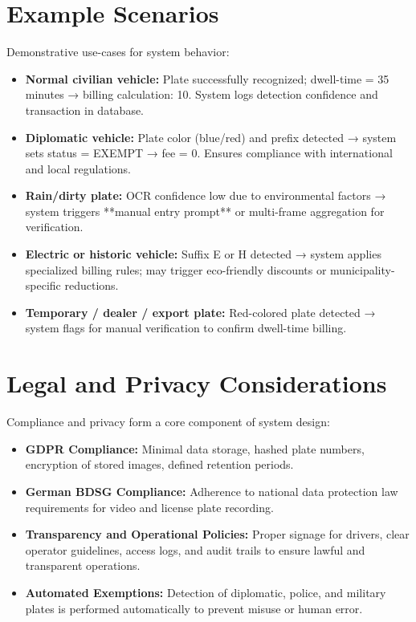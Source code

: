 	\section{Example Scenarios}
	Demonstrative use-cases for system behavior:
	
	\begin{itemize}
		\item \textbf{Normal civilian vehicle:} Plate successfully recognized; dwell-time = 35 minutes → billing calculation: \texteuro{}10. System logs detection confidence and transaction in database.
		\item \textbf{Diplomatic vehicle:} Plate color (blue/red) and prefix detected → system sets status = EXEMPT → fee = \texteuro{}0. Ensures compliance with international and local regulations.
		\item \textbf{Rain/dirty plate:} OCR confidence low due to environmental factors → system triggers **manual entry prompt** or multi-frame aggregation for verification.
		\item \textbf{Electric or historic vehicle:} Suffix E or H detected → system applies specialized billing rules; may trigger eco-friendly discounts or municipality-specific reductions.
		\item \textbf{Temporary / dealer / export plate:} Red-colored plate detected → system flags for manual verification to confirm dwell-time billing.
	\end{itemize}
	
	\section{Legal and Privacy Considerations}
	Compliance and privacy form a core component of system design:
	
	\begin{itemize}
		\item \textbf{GDPR Compliance:} Minimal data storage, hashed plate numbers, encryption of stored images, defined retention periods.
		\item \textbf{German BDSG Compliance:} Adherence to national data protection law requirements for video and license plate recording.
		\item \textbf{Transparency and Operational Policies:} Proper signage for drivers, clear operator guidelines, access logs, and audit trails to ensure lawful and transparent operations.
		\item \textbf{Automated Exemptions:} Detection of diplomatic, police, and military plates is performed automatically to prevent misuse or human error.
	\end{itemize}
	
